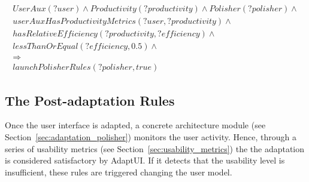\footnotesize
\begin{equation} \label{ec:usability_rule}
  \begin{align*} 
  UserAux(?user) ∧ Productivity(?productivity) ∧ Polisher(?polisher) ∧\\ 
  userAuxHasProductivityMetrics(?user, ?productivity) ∧ \\
  hasRelativeEfficiency(?productivity, ?efficiency) ∧ \\
  lessThanOrEqual(?efficiency, 0.5) ∧ \\
  \Rightarrow \\
  launchPolisherRules(?polisher, true)
  \end{align*}
\end{equation}
\normalsize

\subsection{The Post-adaptation Rules}
Once the user interface is adapted, a concrete architecture module (see 
Section~\ref{sec:adaptation_polisher}) monitors the user activity. Hence, 
through a series of usability metrics (see Section~\ref{sec:usability_metrics}) 
the the adaptation is considered satisfactory by AdaptUI. If it detects that the 
usability level is insufficient, these rules are triggered changing the user model.

